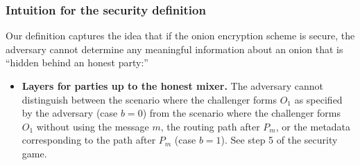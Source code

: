 \documentclass[runningheads,a4paper]{llncs}
\begin{document}
\subsubsection{Intuition for the security definition} \label{sec:intuition}
Our definition captures the idea that if the onion encryption scheme is secure, the adversary cannot determine any meaningful information about an onion that is ``hidden behind an honest party:'' 
\begin{itemize}
\item \textbf{Layers for parties up to the honest mixer.} 
The adversary cannot distinguish between the scenario where the challenger forms $O_1$ as specified by the adversary (case $b=0$) from the scenario where the challenger forms $O_1$ without using the message $m$, the routing path after $P_m$, or the metadata corresponding to the path after $P_m$ (case $b=1$). See step 5 of the security game. 


\end{itemize}
\end{document}
